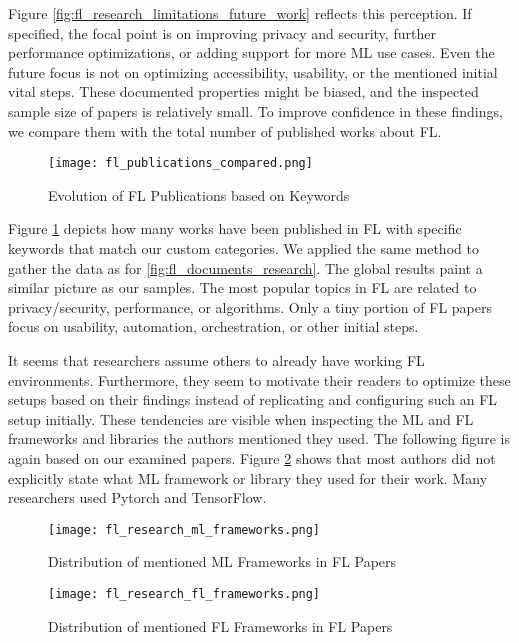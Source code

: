 Figure \ref{fig:fl_research_limitations_future_work} reflects this perception.
If specified, the focal point is on improving privacy and security, further performance optimizations, or adding support for more ML use cases.
Even the future focus is not on optimizing accessibility, usability, or the mentioned initial vital steps.
These documented properties might be biased, and the inspected sample size of papers is relatively small.
To improve confidence in these findings, we compare them with the total number of published works about FL.

\begin{figure}[H]
    \centering
    \texttt{[image: fl\_publications\_compared.png]}
    \caption{Evolution of FL Publications based on Keywords}
    \label{fig:fl_publications_compared}
\end{figure}

Figure \ref{fig:fl_publications_compared} depicts how many works have been published in FL with specific keywords that match our custom categories.
We applied the same method to gather the data as for \ref{fig:fl_documents_research}.
The global results paint a similar picture as our samples.
The most popular topics in FL are related to privacy/security, performance, or algorithms.
Only a tiny portion of FL papers focus on usability, automation, orchestration, or other initial steps.

It seems that researchers assume others to already have working FL environments.
Furthermore, they seem to motivate their readers to optimize these setups based on their findings instead of replicating and configuring such an FL setup initially.
These tendencies are visible when inspecting the ML and FL frameworks and libraries the authors mentioned they used.
The following figure is again based on our examined papers.
Figure \ref{fig:fl_research_ml_frameworks} shows that most authors did not explicitly state what ML framework or library they used for their work.
Many researchers used Pytorch and TensorFlow.

\begin{figure}[h]
    \centering
    \texttt{[image: fl\_research\_ml\_frameworks.png]}
    \caption{Distribution of mentioned ML Frameworks in FL Papers}
    \label{fig:fl_research_ml_frameworks}
\end{figure}

\begin{figure}[h]
    \centering
    \texttt{[image: fl\_research\_fl\_frameworks.png]}
    \caption{Distribution of mentioned FL Frameworks in FL Papers}
    \label{fig:fl_research_fl_frameworks}
\end{figure}

